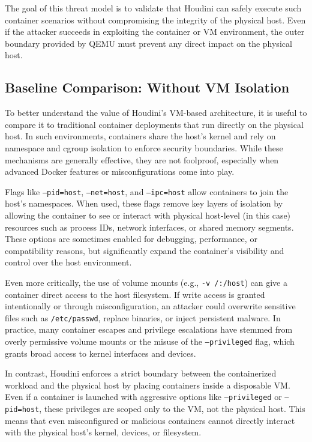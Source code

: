 \begin{doublespace}
The goal of this threat model is to validate that Houdini can safely execute such container scenarios without compromising the integrity of the physical host. Even if the attacker succeeds in exploiting the container or VM environment, the outer boundary provided by QEMU must prevent any direct impact on the physical host.

\subsection{Baseline Comparison: Without VM Isolation}

To better understand the value of Houdini’s VM-based architecture, it is useful to compare it to traditional container deployments that run directly on the physical host. In such environments, containers share the host's kernel and rely on namespace and cgroup isolation to enforce security boundaries. While these mechanisms are generally effective, they are not foolproof, especially when advanced Docker features or misconfigurations come into play.

Flags like \texttt{--pid=host}, \texttt{--net=host}, and \texttt{--ipc=host} allow containers to join the host’s namespaces. When used, these flags remove key layers of isolation by allowing the container to see or interact with physical host-level (in this case) resources such as process IDs, network interfaces, or shared memory segments. These options are sometimes enabled for debugging, performance, or compatibility reasons, but significantly expand the container’s visibility and control over the host environment.

Even more critically, the use of volume mounts (e.g., \texttt{-v /:/host}) can give a container direct access to the host filesystem. If write access is granted intentionally or through misconfiguration, an attacker could overwrite sensitive files such as \texttt{/etc/passwd}, replace binaries, or inject persistent malware. In practice, many container escapes and privilege escalations have stemmed from overly permissive volume mounts or the misuse of the \texttt{--privileged} flag, which grants broad access to kernel interfaces and devices.

In contrast, Houdini enforces a strict boundary between the containerized workload and the physical host by placing containers inside a disposable VM. Even if a container is launched with aggressive options like \texttt{--privileged} or \texttt{--pid=host}, these privileges are scoped only to the VM, not the physical host. This means that even misconfigured or malicious containers cannot directly interact with the physical host's kernel, devices, or filesystem.


\end{doublespace}
